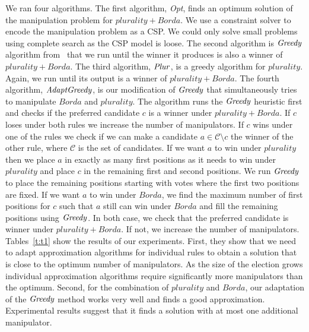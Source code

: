 \documentclass{ecai2012}
\newcommand{\winner}[2]{\mbox{$#1 + #2$}}
\newcommand{\plurshort}{\mbox{\emph{Plur}}\xspace}
\newcommand{\bordashort}{\mbox{\emph{Greedy}}\xspace}
\newcommand{\bordaplurshort}{\mbox{\emph{AdaptGreedy}}\xspace}
\begin{document}
We ran four algorithms. The first algorithm,\emph{ Opt},
finds an optimum solution of the manipulation problem for
$\winner{plurality}{Borda}$.
We use a constraint solver to encode the
manipulation problem as a CSP. We could only solve small
problems using complete search as the CSP model is
loose. %
The second algorithm is $\bordashort$ algorithm from~\cite{zuckermanSODA08}
that we run until the winner
it produces is also a winner of $\winner{plurality}{Borda}$. The third
algorithm, $\plurshort$, is a greedy algorithm for $plurality$.
Again, we run until its output is a winner
of $\winner{plurality}{Borda}$. The fourth algorithm, $\bordaplurshort$,
 is our modification
of $\bordashort$ that simultaneously tries to manipulate
$Borda$ and $plurality$. The algorithm runs the $\bordashort$
heuristic first and checks if the preferred candidate $c$ is
a winner under $\winner{plurality}{Borda}$. If $c$ loses under both
rules we increase the number of manipulators. If $c$
wins under one of the rules we check if we can make
a candidate $a \in \mathcal{C} \setminus c$ the winner
of the other rule, where $\mathcal{C}$ is the set of candidates.
If we want $a$ to win under $plurality$
then we place $a$ in exactly as many first positions
as it needs to win under $plurality$ and place $c$ in the remaining
first and second positions. We run $\bordashort$
to place the remaining  positions starting with
votes where the first two positions are fixed.
If we want $a$ to win  under $Borda$, we
find the maximum number of first
positions for $c$ such that $a$ still can win
under $Borda$ and fill the remaining positions
using $\bordashort$. In both case, we check that
the preferred candidate is winner under
$\winner{plurality}{Borda}$.  If not, we increase the number
of manipulators. Tables~\ref{t:t1}
show the results of our experiments.
First, they show that we need to adapt
approximation algorithms
for individual rules to obtain a
solution that is close to the optimum number
of manipulators. As the size
of the election grows individual
approximation algorithms require
significantly more manipulators
than the optimum.
Second, for the combination of $plurality$
and $Borda$, our adaptation
of the $\bordashort$ method works very well
and finds a good approximation.
Experimental results suggest
that %
it finds a solution with at most one additional
manipulator.










\vspace{-1mm}
\end{document}
